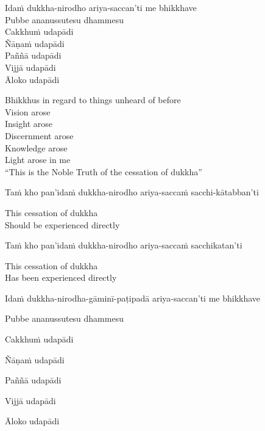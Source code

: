 Idaṁ dukkha-nirodho ariya-saccan'ti me bhikkhave\\
Pubbe ananussutesu dhammesu\\
Cakkhuṁ udapādi\\
Ñāṇaṁ udapādi\\
Paññā udapādi\\
Vijjā udapādi\\
Āloko udapādi

\begin{english-verses}
  Bhikkhus in regard to things unheard of before\\
  Vision arose\\
  Insight arose\\
  Discernment arose\\
  Knowledge arose\\
  Light arose in me\\
  ``This is the Noble Truth of the cessation of dukkha''
\end{english-verses}

Taṁ kho pan'idaṁ dukkha-nirodho ariya-saccaṁ sacchi-kātabban'ti

\begin{english}
  This cessation of dukkha\\
  Should be experienced directly
\end{english}

\begin{pali-hang}
  Taṁ kho pan'idaṁ dukkha-nirodho ariya-saccaṁ sacchikatan'ti
\end{pali-hang}

\begin{english}
  This cessation of dukkha\\
  Has been experienced directly
\end{english}

\begin{pali-hang-firstline}
  Idaṁ dukkha-nirodha-gāminī-paṭipadā ariya-saccan'ti me bhikkhave
\end{pali-hang-firstline}
\begin{pali-hangtogether}
  Pubbe ananussutesu dhammesu
\end{pali-hangtogether}
\begin{pali-hangtogether}
  Cakkhuṁ udapādi
\end{pali-hangtogether}
\begin{pali-hangtogether}
  Ñāṇaṁ udapādi
\end{pali-hangtogether}
\begin{pali-hangtogether}
  Paññā udapādi
\end{pali-hangtogether}
\begin{pali-hangtogether}
  Vijjā udapādi
\end{pali-hangtogether}
\begin{pali-hangtogether}
  Āloko udapādi
\end{pali-hangtogether}

